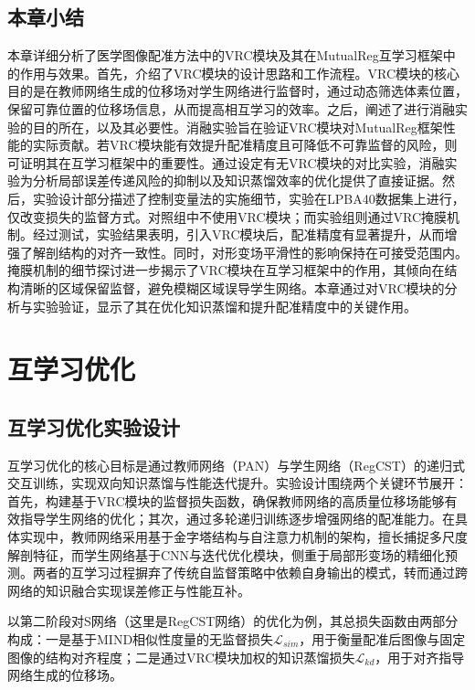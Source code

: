 \section{本章小结}

本章详细分析了医学图像配准方法中的VRC模块及其在MutualReg互学习框架中的作用与效果。首先，介绍了VRC模块的设计思路和工作流程。VRC模块的核心目的是在教师网络生成的位移场对学生网络进行监督时，通过动态筛选体素位置，保留可靠位置的位移场信息，从而提高相互学习的效率。之后，阐述了进行消融实验的目的所在，以及其必要性。消融实验旨在验证VRC模块对MutualReg框架性能的实际贡献。若VRC模块能有效提升配准精度且可降低不可靠监督的风险，则可证明其在互学习框架中的重要性。通过设定有无VRC模块的对比实验，消融实验为分析局部误差传递风险的抑制以及知识蒸馏效率的优化提供了直接证据。然后，实验设计部分描述了控制变量法的实施细节，实验在LPBA40数据集上进行，仅改变损失的监督方式。对照组中不使用VRC模块；而实验组则通过VRC掩膜机制。经过测试，实验结果表明，引入VRC模块后，配准精度有显著提升，从而增强了解剖结构的对齐一致性。同时，对形变场平滑性的影响保持在可接受范围内。掩膜机制的细节探讨进一步揭示了VRC模块在互学习框架中的作用，其倾向在结构清晰的区域保留监督，避免模糊区域误导学生网络。本章通过对VRC模块的分析与实验验证，显示了其在优化知识蒸馏和提升配准精度中的关键作用。

\chapter{互学习优化}

\section{互学习优化实验设计}

互学习优化的核心目标是通过教师网络（PAN）与学生网络（RegCST）的递归式交互训练，实现双向知识蒸馏与性能迭代提升。实验设计围绕两个关键环节展开：首先，构建基于VRC模块的监督损失函数，确保教师网络的高质量位移场能够有效指导学生网络的优化；其次，通过多轮递归训练逐步增强网络的配准能力。在具体实现中，教师网络采用基于金字塔结构与自注意力机制的架构，擅长捕捉多尺度解剖特征，而学生网络基于CNN与迭代优化模块，侧重于局部形变场的精细化预测。两者的互学习过程摒弃了传统自监督策略中依赖自身输出的模式，转而通过跨网络的知识融合实现误差修正与性能互补。

以第二阶段对S网络（这里是RegCST网络）的优化为例，其总损失函数由两部分构成：一是基于MIND相似性度量的无监督损失$\mathcal{L}_{sim}$，用于衡量配准后图像与固定图像的结构对齐程度；二是通过VRC模块加权的知识蒸馏损失$\mathcal{L}_{kd}$，用于对齐指导网络生成的位移场。

